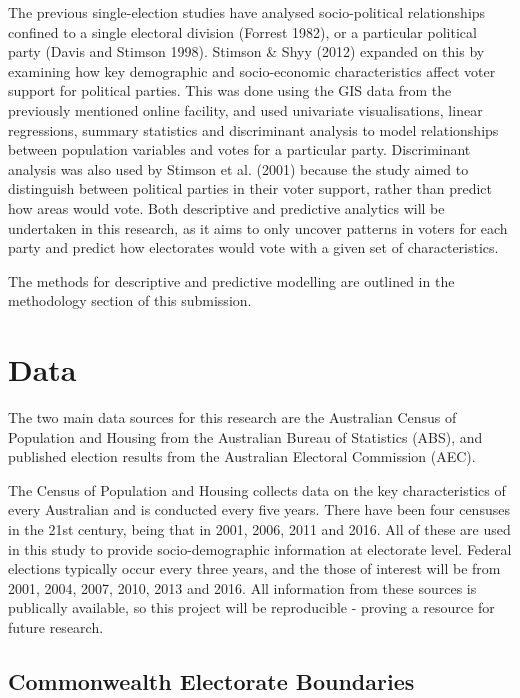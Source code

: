 \documentclass{monashthesis}
\begin{document}
The previous single-election studies have analysed socio-political
relationships confined to a single electoral division (Forrest 1982), or
a particular political party (Davis and Stimson 1998). Stimson \& Shyy
(2012) expanded on this by examining how key demographic and
socio-economic characteristics affect voter support for political
parties. This was done using the GIS data from the previously mentioned
online facility, and used univariate visualisations, linear regressions,
summary statistics and discriminant analysis to model relationships
between population variables and votes for a particular party.
Discriminant analysis was also used by Stimson et al. (2001) because the
study aimed to distinguish between political parties in their voter
support, rather than predict how areas would vote. Both descriptive and
predictive analytics will be undertaken in this research, as it aims to
only uncover patterns in voters for each party and predict how
electorates would vote with a given set of characteristics.

The methods for descriptive and predictive modelling are outlined in the
methodology section of this submission.

\chapter{Data}\label{ch:Data}

The two main data sources for this research are the Australian Census of
Population and Housing from the Australian Bureau of Statistics (ABS),
and published election results from the Australian Electoral Commission
(AEC).

The Census of Population and Housing collects data on the key
characteristics of every Australian and is conducted every five years.
There have been four censuses in the 21st century, being that in 2001,
2006, 2011 and 2016. All of these are used in this study to provide
socio-demographic information at electorate level. Federal elections
typically occur every three years, and the those of interest will be
from 2001, 2004, 2007, 2010, 2013 and 2016. All information from these
sources is publically available, so this project will be reproducible -
proving a resource for future research.

\section{Commonwealth Electorate
Boundaries}\label{commonwealth-electorate-boundaries}
\end{document}
